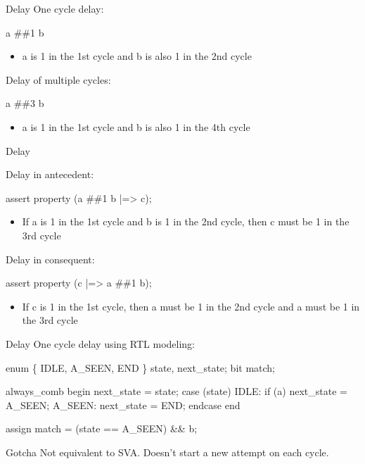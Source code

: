 \documentclass{beamer}
\begin{document}
\begin{frame}{Delay}
One cycle delay:

\begin{semiverbatim}
a \#\#1 b
\end{semiverbatim}

\begin{itemize}
 \item a is 1 in the 1st cycle and b is also 1 in the 2nd cycle
\end{itemize}

\pause
Delay of multiple cycles:

\begin{semiverbatim}
a \#\#3 b
\end{semiverbatim}

\begin{itemize}
 \item a is 1 in the 1st cycle and b is also 1 in the 4th cycle
\end{itemize}
\end{frame}


\begin{frame}{Delay}

Delay in antecedent:
\begin{semiverbatim}
assert property (a \#\#1 b |=> c);
\end{semiverbatim}

\begin{itemize}
 \item If a is 1 in the 1st cycle and b is 1 in the 2nd cycle, then c must be 1 in the 3rd cycle
\end{itemize}

\pause

Delay in consequent:
\begin{semiverbatim}
assert property (c |=> a \#\#1 b);
\end{semiverbatim}

\begin{itemize}
 \item If c is 1 in the 1st cycle, then a must be 1 in the 2nd cycle and a must be 1 in the 3rd cycle
\end{itemize}

\end{frame}


\begin{frame}[fragile]{Delay}
One cycle delay using RTL modeling:

\begin{semiverbatim}
enum \{ IDLE, A_SEEN, END \} state, next_state;
bit match;

always_comb begin
  next_state = state;
  case (state)
    IDLE: if (a) next_state = A_SEEN;
    A_SEEN: next_state = END;
  endcase
end

assign match = (state == A_SEEN) && b;
\end{semiverbatim}

\pause
\begin{alertblock}{Gotcha}
Not equivalent to SVA. Doesn't start a new attempt on each cycle.
\end{alertblock}
\end{frame}
\end{document}
